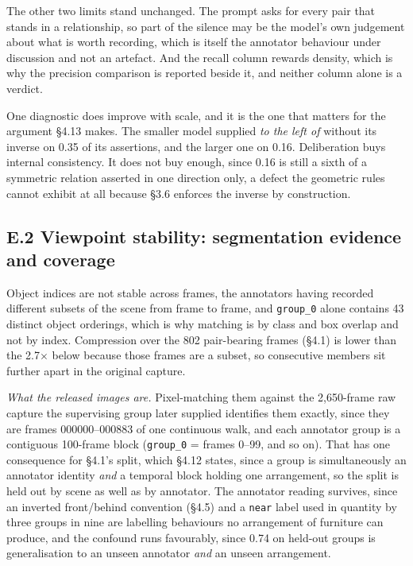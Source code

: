 The other two limits stand unchanged. The prompt asks for every pair that stands in a relationship, so part of the silence may be the model's own judgement about what is worth recording, which is itself the annotator behaviour under discussion and not an artefact. And the recall column rewards density, which is why the precision comparison is reported beside it, and neither column alone is a verdict.

One diagnostic does improve with scale, and it is the one that matters for the argument \S{}4.13 makes. The smaller model supplied \textit{to the left of} without its inverse on 0.35 of its assertions, and the larger one on 0.16. Deliberation buys internal consistency. It does not buy enough, since 0.16 is still a sixth of a symmetric relation asserted in one direction only, a defect the geometric rules cannot exhibit at all because \S{}3.6 enforces the inverse by construction.

\subsection{E.2 Viewpoint stability: segmentation evidence and coverage}

Object indices are not stable across frames, the annotators having recorded different subsets of the scene from frame to frame, and \texttt{group\_\allowbreak{}0} alone contains 43 distinct object orderings, which is why matching is by class and box overlap and not by index. Compression over the 802 pair-bearing frames (\S{}4.1) is lower than the 2.7$\times$ below because those frames are a subset, so consecutive members sit further apart in the original capture.

\textit{What the released images are.} Pixel-matching them against the 2,650-frame raw capture the supervising group later supplied identifies them exactly, since they are frames 000000--000883 of one continuous walk, and each annotator group is a contiguous 100-frame block (\texttt{group\_\allowbreak{}0} = frames 0--99, and so on). That has one consequence for \S{}4.1's split, which \S{}4.12 states, since a group is simultaneously an annotator identity \textit{and} a temporal block holding one arrangement, so the split is held out by scene as well as by annotator. The annotator reading survives, since an inverted front/behind convention (\S{}4.5) and a \texttt{near} label used in quantity by three groups in nine are labelling behaviours no arrangement of furniture can produce, and the confound runs favourably, since 0.74 on held-out groups is generalisation to an unseen annotator \textit{and} an unseen arrangement.

